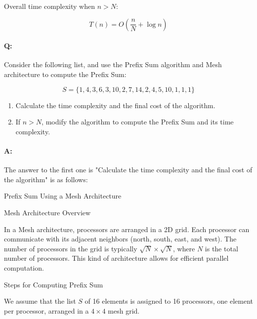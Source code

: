 \documentclass[a4paper,10pt]{article}
\begin{document}
        Overall time complexity when $n > N$:

        $$T(n)=O(\frac{n}{N} + \log n)$$

    \noindent
    \hrulefill


    \paragraph{\bold Q:} Consider the following list, and use the Prefix Sum algorithm and Mesh architecture to compute the Prefix Sum:

    $$S= \{1, 4, 3, 6, 3, 10, 2, 7, 14, 2, 4, 5, 10, 1, 1, 1\}$$

    \begin{enumerate}
        
        \item Calculate the time complexity and the final cost of the algorithm.
        
        \item If $n > N$, modify the algorithm to compute the Prefix Sum and its time complexity.

    \end{enumerate}


    \paragraph{\bold A:} The answer to the first one is "Calculate the time complexity and the final cost of the algorithm" is as follows:

    {\bold Prefix Sum Using a Mesh Architecture}

    {\bold Mesh Architecture Overview}

    In a Mesh architecture, processors are arranged in a 2D grid. Each processor can communicate with its adjacent neighbors (north, south, east, and west). The number of processors in the grid is typically $\sqrt{N} \times \sqrt{N}$, where $N$ is the total number of processors. This kind of architecture allows for efficient parallel computation.
    
    {\bold Steps for Computing Prefix Sum}

    We assume that the list $S$ of 16 elements is assigned to 16 processors, one element per processor, arranged in a $4 \times 4$ mesh grid.
\end{document}
